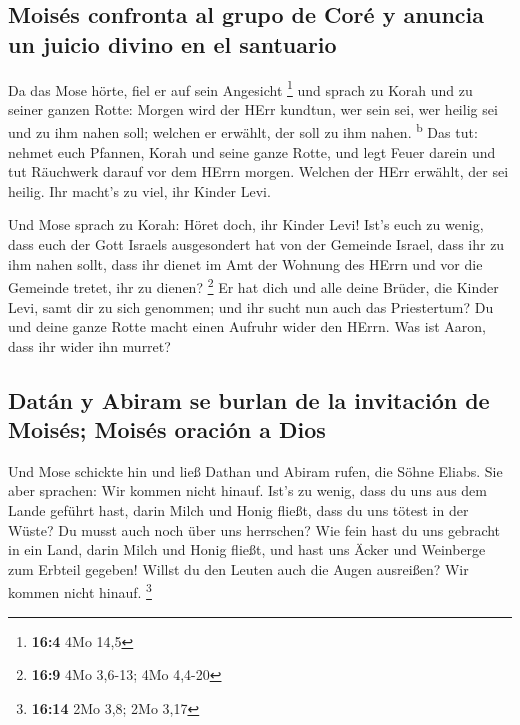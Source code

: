 \hypertarget{moisuxe9s-confronta-al-grupo-de-coruxe9-y-anuncia-un-juicio-divino-en-el-santuario}{%
\subsection{Moisés confronta al grupo de Coré y anuncia un juicio divino
en el
santuario}\label{moisuxe9s-confronta-al-grupo-de-coruxe9-y-anuncia-un-juicio-divino-en-el-santuario}}

 Da das Mose hörte, fiel er auf sein Angesicht \footnote{\textbf{16:4}
  4Mo 14,5}  und sprach zu Korah und zu seiner ganzen
Rotte: Morgen wird der HErr kundtun, wer sein sei, wer heilig sei und zu
ihm nahen soll; welchen er erwählt, der soll zu ihm nahen.
\textsuperscript{b}  Das tut: nehmet euch Pfannen, Korah
und seine ganze Rotte,  und legt Feuer darein und tut
Räuchwerk darauf vor dem HErrn morgen. Welchen der HErr erwählt, der sei
heilig. Ihr macht's zu viel, ihr Kinder Levi.

 Und Mose sprach zu Korah: Höret doch, ihr Kinder Levi!
 Ist's euch zu wenig, dass euch der Gott Israels
ausgesondert hat von der Gemeinde Israel, dass ihr zu ihm nahen sollt,
dass ihr dienet im Amt der Wohnung des HErrn und vor die Gemeinde
tretet, ihr zu dienen? \footnote{\textbf{16:9} 4Mo 3,6-13; 4Mo 4,4-20}
 Er hat dich und alle deine Brüder, die Kinder Levi, samt
dir zu sich genommen; und ihr sucht nun auch das Priestertum?
 Du und deine ganze Rotte macht einen Aufruhr wider den
HErrn. Was ist Aaron, dass ihr wider ihn murret?

\hypertarget{datuxe1n-y-abiram-se-burlan-de-la-invitaciuxf3n-de-moisuxe9s-moisuxe9s-oraciuxf3n-a-dios}{%
\subsection{Datán y Abiram se burlan de la invitación de Moisés; Moisés
oración a
Dios}\label{datuxe1n-y-abiram-se-burlan-de-la-invitaciuxf3n-de-moisuxe9s-moisuxe9s-oraciuxf3n-a-dios}}

 Und Mose schickte hin und ließ Dathan und Abiram rufen,
die Söhne Eliabs. Sie aber sprachen: Wir kommen nicht hinauf.
 Ist's zu wenig, dass du uns aus dem Lande geführt hast,
darin Milch und Honig fließt, dass du uns tötest in der Wüste? Du musst
auch noch über uns herrschen?  Wie fein hast du uns
gebracht in ein Land, darin Milch und Honig fließt, und hast uns Äcker
und Weinberge zum Erbteil gegeben! Willst du den Leuten auch die Augen
ausreißen? Wir kommen nicht hinauf. \footnote{\textbf{16:14} 2Mo 3,8;
  2Mo 3,17}

